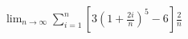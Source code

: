\item $\displaystyle \lim_{n \to \infty} \sum_{i=1}^n \left[ 3\left(1 + \frac{2i}{n}\right)^5 - 6 \right] \frac{2}{n}$
